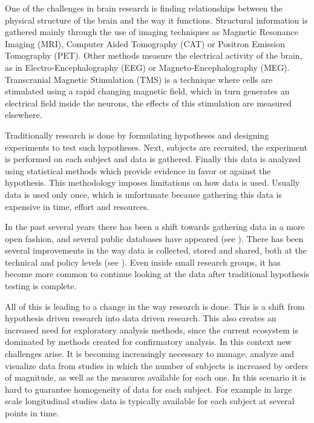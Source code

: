 

One of the challenges in brain research is finding relationships between the physical structure of the brain and the way it functions. Structural information is gathered mainly through the use of imaging techniques as Magnetic Resonance Imaging (MRI), Computer Aided Tomography (CAT) or Positron Emission Tomography (PET). Other methods measure the electrical activity of the brain, as in Electro-Encephalography  (EEG) or Magneto-Encephalography (MEG). Transcranial Magnetic Stimulation (TMS) is a technique where cells are stimulated using a rapid changing magnetic field, which in turn generates an electrical field inside the neurons, the effects of this stimulation are measured elsewhere.

Traditionally research is done by formulating hypotheses and designing experiments to test such hypotheses. Next, subjects are recruited, the experiment is performed on each subject and data is gathered. Finally this data is analyzed using statistical methods which provide evidence in favor or against the hypothesis. This methodology imposes limitations on how data is used. Usually data is used only once, which is unfortunate because gathering this data is expensive in time, effort and resources.

In the past several years there has been a shift towards gathering data in a more open fashion, and several public databases have appeared (see \autocite{milham_open_2012}). There has been several improvements in the way data is collected, stored and shared, both at the technical and policy levels  (see \autocite{eckersley_neuroscience_2003}). Even inside small research groups, it has become more common to continue looking at the data after traditional hypothesis testing is complete.

All of this is leading to a change in the way research is done. This is a shift from hypothesis driven research into data driven research. This also creates an increased need for exploratory analysis methods, since the current ecosystem is dominated by methods created for confirmatory analysis. In this context new challenges arise. It is becoming increasingly necessary to manage, analyze and visualize data from studies in which the number of subjects is increased by orders of magnitude, as well as the measures available for each one. In this scenario it is hard to guarantee homogeneity of data for each subject. For example in large scale longitudinal studies data is typically available for each subject at several points in time.

